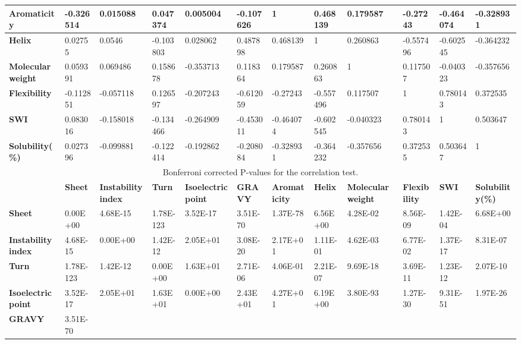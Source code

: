 \begin{table}[h]
{{\begin{tabular}{|l|l|l|l|l|l|l|l|l|l|l|l|}
\textbf{Aromaticity} &
  -0.326514 &
  0.015088 &
  0.047374 &
  0.005004 &
  -0.107626 &
  1 &
  0.468139 &
  0.179587 &
  -0.27243 &
  -0.464074 &
  -0.328931 \\ \hline
\textbf{Helix} &
  0.02755 &
  0.0546 &
  -0.103803 &
  0.028062 &
  0.487898 &
  0.468139 &
  1 &
  0.260863 &
  -0.557496 &
  -0.602545 &
  -0.364232 \\ \hline
\textbf{Molecular weight} &
  0.059391 &
  0.069486 &
  0.158678 &
  -0.353713 &
  0.118364 &
  0.179587 &
  0.260863 &
  1 &
  0.117507 &
  -0.040323 &
  -0.357656 \\ \hline
\textbf{Flexibility} &
  -0.112851 &
  -0.057118 &
  0.126597 &
  -0.207243 &
  -0.612059 &
  -0.27243 &
  -0.557496 &
  0.117507 &
  1 &
  0.780143 &
  0.372535 \\ \hline
\textbf{SWI} &
  0.083016 &
  -0.158018 &
  -0.134466 &
  -0.264909 &
  -0.453011 &
  -0.464074 &
  -0.602545 &
  -0.040323 &
  0.780143 &
  1 &
  0.503647 \\ \hline
\textbf{Solubility(\%)} &
  0.027396 &
  -0.099881 &
  -0.122414 &
  -0.192862 &
  -0.208084 &
  -0.328931 &
  -0.364232 &
  -0.357656 &
  0.372535 &
  0.503647 &
  1 \\ \hline
\multicolumn{12}{|c|}{Bonferroni corrected P-values for the correlation test.} \\ \hline
\textbf{} &
  \textbf{Sheet} &
  \textbf{Instability index} &
  \textbf{Turn} &
  \textbf{Isoelectric point} &
  \textbf{GRAVY} &
  \textbf{Aromaticity} &
  \textbf{Helix} &
  \textbf{Molecular weight} &
  \textbf{Flexibility} &
  \textbf{SWI} &
  \textbf{Solubility(\%)} \\ \hline
\textbf{Sheet} &
  0.00E+00 &
  4.68E-15 &
  1.78E-123 &
  3.52E-17 &
  3.51E-70 &
  1.37E-78 &
  6.56E+00 &
  4.28E-02 &
  8.56E-09 &
  1.42E-04 &
  6.68E+00 \\ \hline
\textbf{Instability index} &
  4.68E-15 &
  0.00E+00 &
  1.42E-12 &
  2.05E+01 &
  3.08E-20 &
  2.17E+01 &
  1.11E-01 &
  4.62E-03 &
  6.77E-02 &
  1.37E-17 &
  8.31E-07 \\ \hline
\textbf{Turn} &
  1.78E-123 &
  1.42E-12 &
  0.00E+00 &
  1.63E+01 &
  2.71E-06 &
  4.06E-01 &
  2.21E-07 &
  9.69E-18 &
  3.69E-11 &
  1.23E-12 &
  2.07E-10 \\ \hline
\textbf{Isoelectric point} &
  3.52E-17 &
  2.05E+01 &
  1.63E+01 &
  0.00E+00 &
  2.43E+01 &
  4.27E+01 &
  6.19E+00 &
  3.80E-93 &
  1.27E-30 &
  9.31E-51 &
  1.97E-26 \\ \hline
\textbf{GRAVY} &
  3.51E-70 &

\end{tabular}}}
\end{table}
